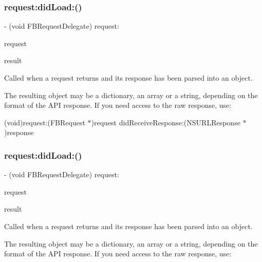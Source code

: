 \subsubsection{\texorpdfstring{request\+:did\+Load\+:()}{request:didLoad:()}\hspace{0.1cm}{\footnotesize\ttfamily [1/2]}}
{\footnotesize\ttfamily -\/ (void F\+B\+Request\+Delegate) request\+: \begin{DoxyParamCaption}\item[{(\hyperlink{interfaceFBRequest}{F\+B\+Request} $\ast$)}]{request }\item[{didLoad:(id)}]{result }\end{DoxyParamCaption}\hspace{0.3cm}{\ttfamily [optional]}}

Called when a request returns and its response has been parsed into an object.

The resulting object may be a dictionary, an array or a string, depending on the format of the A\+PI response. If you need access to the raw response, use\+:

(void)request\+:(\+F\+B\+Request $\ast$)request did\+Receive\+Response\+:(\+N\+S\+U\+R\+L\+Response $\ast$)response \mbox{\label{protocolFBRequestDelegate_01-p_a918115a5573611db01699d77852b314d}} 
\subsubsection{\texorpdfstring{request\+:did\+Load\+:()}{request:didLoad:()}\hspace{0.1cm}{\footnotesize\ttfamily [2/2]}}
{\footnotesize\ttfamily -\/ (void F\+B\+Request\+Delegate) request\+: \begin{DoxyParamCaption}\item[{(\hyperlink{interfaceFBRequest}{F\+B\+Request} $\ast$)}]{request }\item[{didLoad:(id)}]{result }\end{DoxyParamCaption}\hspace{0.3cm}{\ttfamily [optional]}}

Called when a request returns and its response has been parsed into an object.

The resulting object may be a dictionary, an array or a string, depending on the format of the A\+PI response. If you need access to the raw response, use\+:

